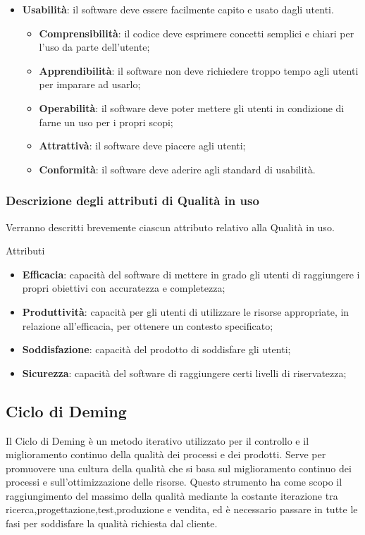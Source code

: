 \documentclass[../piano-di-qualifica.tex]{subfiles}
\begin{document}
\begin{itemize}
        \item \textbf{Usabilità}: il software deve essere facilmente capito e usato dagli utenti.
        \begin{itemize}
            \item \textbf{Comprensibilità}: il codice deve esprimere concetti semplici e chiari per l'uso da parte dell'utente;
            \item \textbf{Apprendibilità}: il software non deve richiedere troppo tempo agli utenti per imparare ad usarlo;
            \item \textbf{Operabilità}: il software deve poter mettere gli utenti in condizione di farne un uso per i propri scopi;
            \item \textbf{Attrattivà}: il software deve piacere agli utenti;
            \item \textbf{Conformità}: il software deve aderire agli standard di usabilità.
        \end{itemize}
\end{itemize}


\subsubsection{Descrizione degli attributi di Qualità in uso}%
\label{sec:descrizione_attributi_in_uso}
Verranno descritti brevemente ciascun attributo relativo alla Qualità in uso.

Attributi
\begin{itemize}
    \item \textbf{Efficacia}: capacità del software di mettere in grado gli utenti di raggiungere i propri obiettivi con accuratezza e completezza;
    \item \textbf{Produttività}: capacità per gli utenti di utilizzare le risorse appropriate, in relazione all'efficacia, per ottenere un contesto specificato;
    \item \textbf{Soddisfazione}: capacità del prodotto di soddisfare gli utenti;
    \item \textbf{Sicurezza}: capacità del software di raggiungere certi livelli di riservatezza;
\end{itemize}

\subsection{Ciclo di Deming}%
\label{sec:ciclo_di_deming}
Il Ciclo di Deming è un metodo iterativo utilizzato per il controllo e il miglioramento continuo della qualità dei processi e dei prodotti.
Serve per promuovere una cultura della qualità che si basa sul miglioramento continuo dei processi e sull'ottimizzazione delle risorse.
Questo strumento ha come scopo il raggiungimento del massimo della qualità mediante la costante iterazione tra ricerca,progettazione,test,produzione e vendita, ed è necessario passare in tutte le fasi per soddisfare la qualità richiesta dal cliente.
\end{document}
